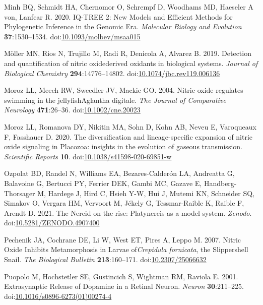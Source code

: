 \documentclass[
  10pt,
  onecolumn]{article}
\newlength{\cslhangindent}
\newlength{\cslentryspacingunit} %
\newenvironment{CSLReferences}[2] %
 {%
  \setlength{\parindent}{0pt}
  \ifodd #1
  \let\oldpar\par
  \def\par{\hangindent=\cslhangindent\oldpar}
  \fi
  \setlength{\parskip}{#2\cslentryspacingunit}
 }%
 {}
\begin{document}
\begin{CSLReferences}{1}{0}
\leavevmode{}%
Minh BQ, Schmidt HA, Chernomor O, Schrempf D, Woodhams MD, Haeseler A
von, Lanfear R. 2020. IQ-TREE 2: New Models and Efficient Methods for
Phylogenetic Inference in the Genomic Era. \emph{Molecular Biology and
Evolution} \textbf{37}:1530--1534.
doi:\href{https://doi.org/10.1093/molbev/msaa015}{10.1093/molbev/msaa015}

\leavevmode{}%
Möller MN, Rios N, Trujillo M, Radi R, Denicola A, Alvarez B. 2019.
Detection and quantification of nitric oxide{\textendash}derived
oxidants in biological systems. \emph{Journal of Biological Chemistry}
\textbf{294}:14776--14802.
doi:\href{https://doi.org/10.1074/jbc.rev119.006136}{10.1074/jbc.rev119.006136}

\leavevmode{}%
Moroz LL, Meech RW, Sweedler JV, Mackie GO. 2004. Nitric oxide regulates
swimming in the jellyfishAglantha digitale. \emph{The Journal of
Comparative Neurology} \textbf{471}:26--36.
doi:\href{https://doi.org/10.1002/cne.20023}{10.1002/cne.20023}

\leavevmode{}%
Moroz LL, Romanova DY, Nikitin MA, Sohn D, Kohn AB, Neveu E, Varoqueaux
F, Fasshauer D. 2020. The diversification and lineage-specific expansion
of nitric oxide signaling in Placozoa: insights in the evolution of
gaseous transmission. \emph{Scientific Reports} \textbf{10}.
doi:\href{https://doi.org/10.1038/s41598-020-69851-w}{10.1038/s41598-020-69851-w}

\leavevmode{}%
Ozpolat BD, Randel N, Williams EA, Bezares-Calderón LA, Andreatta G,
Balavoine G, Bertucci PY, Ferrier DEK, Gambi MC, Gazave E,
Handberg-Thorsager M, Hardege J, Hird C, Hsieh Y-W, Hui J, Mutemi KN,
Schneider SQ, Simakov O, Vergara HM, Vervoort M, Jékely G,
Tessmar-Raible K, Raible F, Arendt D. 2021. The Nereid on the rise:
Platynereis as a model system. \emph{Zenodo}.
doi:\href{https://doi.org/10.5281/ZENODO.4907400}{10.5281/ZENODO.4907400}

\leavevmode{}%
Pechenik JA, Cochrane DE, Li W, West ET, Pires A, Leppo M. 2007. Nitric
Oxide Inhibits Metamorphosis in Larvae of{\emph{Crepidula fornicata}},
the Slippershell Snail. \emph{The Biological Bulletin}
\textbf{213}:160--171.
doi:\href{https://doi.org/10.2307/25066632}{10.2307/25066632}

\leavevmode{}%
Puopolo M, Hochstetler SE, Gustincich S, Wightman RM, Raviola E. 2001.
Extrasynaptic Release of Dopamine in a Retinal Neuron. \emph{Neuron}
\textbf{30}:211--225.
doi:\href{https://doi.org/10.1016/s0896-6273(01)00274-4}{10.1016/s0896-6273(01)00274-4}


\end{CSLReferences}
\end{document}
